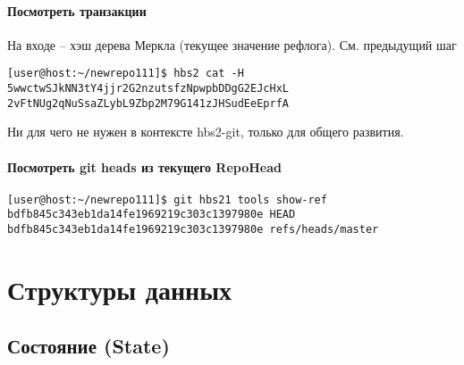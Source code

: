 \documentclass[11pt,a4paper]{article}
\begin{document}
\paragraph{Посмотреть транзакции}

На входе -- хэш дерева Меркла (текущее значение рефлога). См. предыдущий шаг

\begin{verbatim}
[user@host:~/newrepo111]$ hbs2 cat -H 5wwctwSJkNN3tY4jjr2G2nzutsfzNpwpbDDgG2EJcHxL
2vFtNUg2qNuSsaZLybL9Zbp2M79G141zJHSudEeEprfA
\end{verbatim}

Ни для чего не нужен в контексте hbs2-git, только для общего развития.

\paragraph{Посмотреть git heads из текущего RepoHead}

\begin{verbatim}
[user@host:~/newrepo111]$ git hbs21 tools show-ref
bdfb845c343eb1da14fe1969219c303c1397980e HEAD
bdfb845c343eb1da14fe1969219c303c1397980e refs/heads/master
\end{verbatim}

\section{Структуры данных}

\subsection{Состояние (State)}
\end{document}
